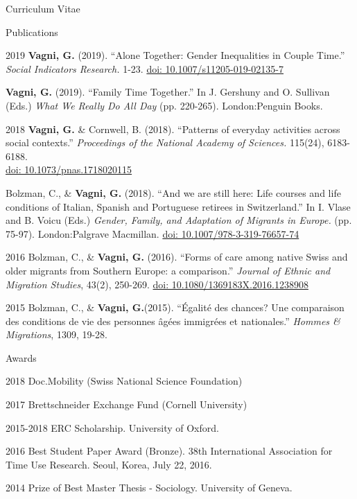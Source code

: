 \documentclass[12pt,a4paper]{article}
\begin{document}
\begin{cv}{Curriculum Vitae}
 
 \newpage
 
   \begin{cvlist}{Publications}
	
	 \item [2019] \textbf{Vagni, G.} (2019). ``Alone Together: Gender Inequalities in Couple Time.'' \emph{Social Indicators Research.} 1-23. \href{https://doi.org/10.1007/s11205-019-02135-7}{doi: 10.1007/s11205-019-02135-7} 
	 
		\item [] \textbf{Vagni, G.}  (2019). ``Family Time Together.'' In J. Gershuny and O. Sullivan (Eds.) \emph{What We Really Do All Day} (pp. 220-265). London:Penguin Books.  
		
		
		 \item [2018] \textbf{Vagni, G.} \& Cornwell, B. (2018). ``Patterns of everyday activities across social contexts.'' \emph{Proceedings of the National Academy of Sciences.} 115(24), 6183-6188. \\ \href{https://doi.org/10.1073/pnas.1718020115}{doi: 10.1073/pnas.1718020115} 
		 		  	
		  		    	 	 
		   \item [] Bolzman, C., \& \textbf{Vagni, G.} (2018). ``And we are still here: Life courses and life conditions of Italian, Spanish and Portuguese retirees in Switzerland.'' In I. Vlase and B. Voicu (Eds.) \emph{Gender, Family, and Adaptation of Migrants in Europe.} (pp. 75-97). London:Palgrave Macmillan. \href{https://doi.org/10.1007/978-3-319-76657-7_4}{doi: 10.1007/978-3-319-76657-74} 
  	 	    	 
   	\item [2016] Bolzman, C., \& \textbf{Vagni, G.}  (2016). ``Forms of care among native Swiss and older migrants from Southern Europe: a comparison.'' \emph{Journal of Ethnic and Migration Studies}, 43(2), 250-269. 
   	\href{https://doi.org/10.1080/1369183X.2016.1238908}{doi: 10.1080/1369183X.2016.1238908} 
   	
   	\item [2015]
   	Bolzman, C., \& \textbf{Vagni, G.}(2015). ``{\'E}galit{\'e} des chances? Une
   	comparaison des conditions de vie des personnes {\^a}g{\'e}es immigr{\'e}es
   	et nationales.'' \emph{Hommes \& Migrations}, 1309, 19-28.
   				  
   \end{cvlist}
 
 
    \begin{cvlist}{Awards}
    	\item[2018]  Doc.Mobility (Swiss National Science Foundation)
    	\item[2017]  Brettschneider Exchange Fund (Cornell University)
    	\item [2015-2018] ERC Scholarship. University of Oxford. 
    	\item [2016]  Best Student Paper Award (Bronze). 38th International Association for Time Use Research. Seoul, Korea, July 22, 2016. 
    	\item [2014] Prize of Best Master Thesis - Sociology.  University of Geneva. 
    \end{cvlist}


\end{cv}
\end{document}
